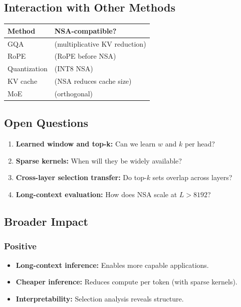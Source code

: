 \subsection{Interaction with Other Methods}

\begin{table}[H]
\centering
\small
\begin{tabular}{ll}
\toprule
\textbf{Method} & \textbf{NSA-compatible?} \\
\midrule
GQA & (multiplicative KV reduction) \\
RoPE & (RoPE before NSA) \\
Quantization & (INT8 NSA) \\
KV cache & (NSA reduces cache size) \\
MoE & (orthogonal) \\
\bottomrule
\end{tabular}
\end{table}

\subsection{Open Questions}

\begin{enumerate}
\item \textbf{Learned window and top-k:} Can we learn $w$ and $k$ per head?
\item \textbf{Sparse kernels:} When will they be widely available?
\item \textbf{Cross-layer selection transfer:} Do top-$k$ sets overlap across layers?
\item \textbf{Long-context evaluation:} How does NSA scale at $L > 8192$?

\end{enumerate}
\subsection{Broader Impact}

\subsubsection{Positive}
\begin{itemize}
\item \textbf{Long-context inference:} Enables more capable applications.
\item \textbf{Cheaper inference:} Reduces compute per token (with sparse kernels).
\item \textbf{Interpretability:} Selection analysis reveals structure.

\end{itemize}
